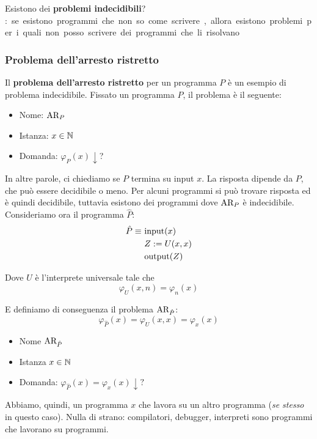Esistono dei \textbf{problemi indecidibili}? \si: se esistono programmi che non so come scrivere, allora esistono problemi per i quali non posso scrivere dei programmi che li risolvano.\\

\subsubsection{Problema dell'arresto ristretto}

Il \textbf{problema dell'arresto ristretto} per un programma $P$ è un esempio di problema indecidibile. Fissato un programma $P$, il problema è il seguente: 
\begin{itemize}
	\item Nome: $\text{AR}_P$
	\item Istanza: $x \in \mathbb{N}$
	\item Domanda: $\varphi_P (x) \downarrow$?
\end{itemize}

In altre parole, ci chiediamo se $P$ termina su input $x$. La risposta dipende da $P$, che può essere decidibile o meno. Per alcuni programmi si può trovare risposta ed è quindi decidibile, tuttavia esistono dei programmi dove $\text{AR}_P$ è indecidibile.\\

Consideriamo ora il programma $\hat{P}$:
\begin{align}
	\hat{P} \equiv\ & \text{input($x$)}       \notag\\
	& Z := U(x,x)                             \notag\\
	& \text{output($Z$)}                      \notag
\end{align}

Dove $U$ è l'interprete universale tale che
$$ \varphi_U (x,n) = \varphi_n (x) $$
	
E definiamo di conseguenza il problema $\text{AR}_{\hat{P}}$:
$$ \varphi_{\hat{P}}(x) = \varphi_{U}(x,x) = \varphi_{x}(x) $$
\begin{itemize}
	\item Nome $\text{AR}_{\hat{P}}$
	\item Istanza $ x \in \mathbb{N}$
	\item Domanda: $\varphi_{\hat{P}}(x) = \varphi_x(x) \downarrow ?$
\end{itemize}

Abbiamo, quindi, un programma $x$ che lavora su un altro programma (\textit{se stesso} in questo caso). Nulla di strano: compilatori, debugger, interpreti sono programmi che lavorano su programmi. \\


